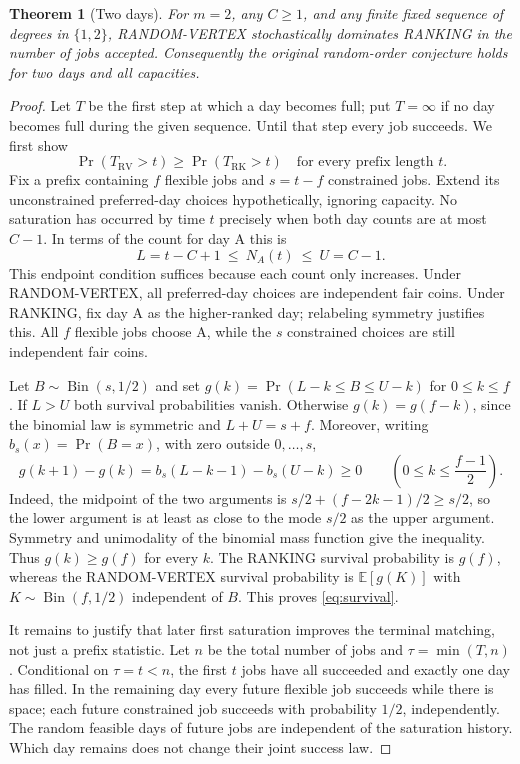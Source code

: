 \documentclass[11pt]{article}
\newtheorem{theorem}{Theorem}
\newcommand{\RV}{\mathrm{RV}}
\newcommand{\RK}{\mathrm{RK}}
\begin{document}
\begin{theorem}[Two days]
For $m=2$, any $C\geq1$, and any finite fixed sequence of degrees in
$\{1,2\}$, RANDOM-VERTEX stochastically dominates RANKING in the number
of jobs accepted. Consequently the original random-order conjecture holds
for two days and all capacities.
\end{theorem}
\begin{proof}
Let $T$ be the first step at which a day becomes full; put $T=\infty$
if no day becomes full during the given sequence. Until that step every
job succeeds. We first show
\begin{equation}\label{eq:survival}
 \Pr(T_\RV>t)\geq\Pr(T_\RK>t)\quad\text{for every prefix length }t.
\end{equation}
Fix a prefix containing $f$ flexible jobs and $s=t-f$ constrained jobs.
Extend its unconstrained preferred-day choices hypothetically, ignoring
capacity. No saturation has occurred by time $t$ precisely when both
day counts are at most $C-1$. In terms of the count for day A this is
\[
 L=t-C+1\ \leq\ N_A(t)\ \leq\ U=C-1.
\]
This endpoint condition suffices because each count only increases.
Under RANDOM-VERTEX, all preferred-day choices are independent fair
coins. Under RANKING, fix day A as the higher-ranked day; relabeling
symmetry justifies this. All $f$ flexible jobs choose A, while the
$s$ constrained choices are still independent fair coins.

Let $B\sim\operatorname{Bin}(s,1/2)$ and set
$g(k)=\Pr(L-k\leq B\leq U-k)$ for $0\leq k\leq f$.
If $L>U$ both survival probabilities vanish. Otherwise
$g(k)=g(f-k)$, since the binomial law is symmetric and $L+U=s+f$.
Moreover, writing $b_s(x)=\Pr(B=x)$, with zero outside $0,\ldots,s$,
\[
 g(k+1)-g(k)=b_s(L-k-1)-b_s(U-k)\geq0
 \qquad\left(0\leq k\leq\frac{f-1}{2}\right).
\]
Indeed, the midpoint of the two arguments is
$s/2+(f-2k-1)/2\geq s/2$, so the lower argument is at least as close
to the mode $s/2$ as the upper argument. Symmetry and unimodality of the
binomial mass function give the inequality. Thus $g(k)\geq g(f)$ for
every $k$. The RANKING survival probability is $g(f)$, whereas the
RANDOM-VERTEX survival probability is $\mathbb E[g(K)]$ with
$K\sim\operatorname{Bin}(f,1/2)$ independent of $B$. This proves
\eqref{eq:survival}.

It remains to justify that later first saturation improves the terminal
matching, not just a prefix statistic. Let $n$ be the total number of
jobs and $\tau=\min(T,n)$. Conditional on $\tau=t<n$, the first $t$
jobs have all succeeded and exactly one day has filled. In the remaining
day every future flexible job succeeds while there is space; each future
constrained job succeeds with probability $1/2$, independently. The
random feasible days of future jobs are independent of the saturation
history. Which day remains does not change their joint success law.


\end{proof}
\end{document}
